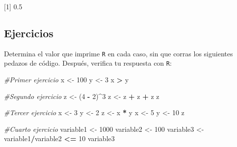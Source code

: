 \documentclass[
]{book}
\newenvironment{Shaded}{\begin{snugshade}}{\end{snugshade}}
\newcommand{\CommentTok}[1]{\textcolor[rgb]{0.56,0.35,0.01}{\textit{#1}}}
\newcommand{\DecValTok}[1]{\textcolor[rgb]{0.00,0.00,0.81}{#1}}
\newcommand{\NormalTok}[1]{#1}
\newcommand{\OperatorTok}[1]{\textcolor[rgb]{0.81,0.36,0.00}{\textbf{#1}}}
\newcommand{\StringTok}[1]{\textcolor[rgb]{0.31,0.60,0.02}{#1}}
\begin{document}
{[}1{]} 0.5

\hypertarget{ejercicios}{%
\subsection{Ejercicios}\label{ejercicios}}

Determina el valor que imprime \texttt{R} en cada caso, sin que corras los siguientes pedazos de código. Después, verifica tu respuesta con \texttt{R}:

\begin{Shaded}
\begin{Highlighting}[]
\CommentTok{#Primer ejercicio}
\NormalTok{x <-}\StringTok{ }\DecValTok{100}
\NormalTok{y <-}\StringTok{ }\DecValTok{3}
\NormalTok{x }\OperatorTok{>}\StringTok{ }\NormalTok{y}
\end{Highlighting}
\end{Shaded}

\begin{Shaded}
\begin{Highlighting}[]
\CommentTok{#Segundo ejercicio}
\NormalTok{z <-}\StringTok{ }\NormalTok{(}\DecValTok{4} \OperatorTok{-}\StringTok{ }\DecValTok{2}\NormalTok{)}\OperatorTok{^}\DecValTok{3}
\NormalTok{z <-}\StringTok{ }\NormalTok{z }\OperatorTok{+}\StringTok{ }\NormalTok{z }\OperatorTok{+}\StringTok{ }\NormalTok{z}
\NormalTok{z}
\end{Highlighting}
\end{Shaded}

\begin{Shaded}
\begin{Highlighting}[]
\CommentTok{#Tercer ejercicio}
\NormalTok{x <-}\StringTok{ }\DecValTok{3}
\NormalTok{y <-}\StringTok{ }\DecValTok{2}
\NormalTok{z <-}\StringTok{ }\NormalTok{x }\OperatorTok{*}\StringTok{ }\NormalTok{y}
\NormalTok{x <-}\StringTok{ }\DecValTok{5}
\NormalTok{y <-}\StringTok{ }\DecValTok{10}
\NormalTok{z}
\end{Highlighting}
\end{Shaded}

\begin{Shaded}
\begin{Highlighting}[]
\CommentTok{#Cuarto ejercicio}
\NormalTok{variable1 <-}\StringTok{ }\DecValTok{1000}
\NormalTok{variable2 <-}\StringTok{ }\DecValTok{100}
\NormalTok{variable3 <-}\StringTok{ }\NormalTok{variable1}\OperatorTok{/}\NormalTok{variable2 }\OperatorTok{<=}\StringTok{ }\DecValTok{10}
\NormalTok{variable3}
\end{Highlighting}
\end{Shaded}
\end{document}
